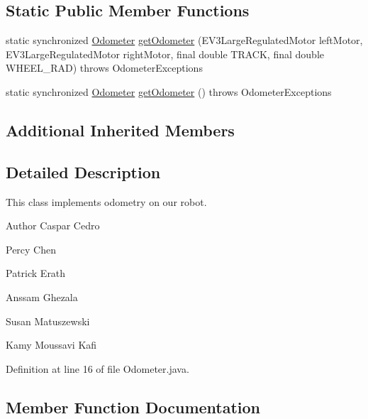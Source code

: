 \subsection*{Static Public Member Functions}
\begin{DoxyCompactItemize}
\item 
static synchronized \hyperlink{classca_1_1mcgill_1_1ecse211_1_1odometer_1_1_odometer}{Odometer} \hyperlink{classca_1_1mcgill_1_1ecse211_1_1odometer_1_1_odometer_a99171f11e34dea918fa9dd069d721439}{get\+Odometer} (E\+V3\+Large\+Regulated\+Motor left\+Motor, E\+V3\+Large\+Regulated\+Motor right\+Motor, final double T\+R\+A\+CK, final double W\+H\+E\+E\+L\+\_\+\+R\+AD)  throws Odometer\+Exceptions 
\item 
static synchronized \hyperlink{classca_1_1mcgill_1_1ecse211_1_1odometer_1_1_odometer}{Odometer} \hyperlink{classca_1_1mcgill_1_1ecse211_1_1odometer_1_1_odometer_a4e069b5a96cd43b29af0785244a99b51}{get\+Odometer} ()  throws Odometer\+Exceptions 
\end{DoxyCompactItemize}
\subsection*{Additional Inherited Members}


\subsection{Detailed Description}
This class implements odometry on our robot.

\begin{DoxyAuthor}{Author}
Caspar Cedro 

Percy Chen 

Patrick Erath 

Anssam Ghezala 

Susan Matuszewski 

Kamy Moussavi Kafi 
\end{DoxyAuthor}


Definition at line 16 of file Odometer.\+java.



\subsection{Member Function Documentation}
\mbox{\label{classca_1_1mcgill_1_1ecse211_1_1odometer_1_1_odometer_a99171f11e34dea918fa9dd069d721439}} 
